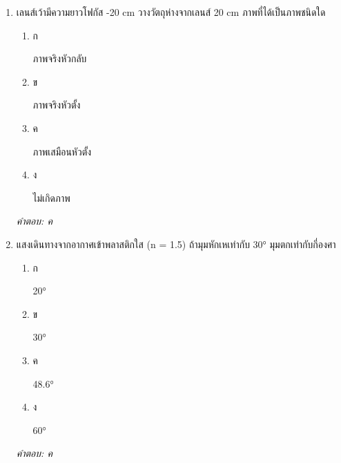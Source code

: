 \documentclass[12pt]{article}
\begin{document}
\begin{enumerate}[label=\arabic*., itemsep=0.5\baselineskip, topsep=0.5\baselineskip, leftmargin=*]
\item เลนส์เว้ามีความยาวโฟกัส -20 cm วางวัตถุห่างจากเลนส์ 20 cm ภาพที่ได้เป็นภาพชนิดใด
\begin{enumerate}[label=\alph*)., itemsep=0.3\baselineskip, topsep=0.3\baselineskip]
\item ก\ 
\begin{minipage}[t]{0.9\linewidth}
\raggedright ภาพจริงหัวกลับ
\end{minipage}
\item ข\ 
\begin{minipage}[t]{0.9\linewidth}
\raggedright ภาพจริงหัวตั้ง
\end{minipage}
\item ค\ 
\begin{minipage}[t]{0.9\linewidth}
\raggedright ภาพเสมือนหัวตั้ง
\end{minipage}
\item ง\ 
\begin{minipage}[t]{0.9\linewidth}
\raggedright ไม่เกิดภาพ
\end{minipage}
\end{enumerate}
\vspace{-0.3\baselineskip}
\begin{small}
\textit{คำตอบ: ค}
\end{small}

\item แสงเดินทางจากอากาศเข้าพลาสติกใส (n = 1.5) ถ้ามุมหักเหเท่ากับ 30° มุมตกเท่ากับกี่องศา
\begin{enumerate}[label=\alph*)., itemsep=0.3\baselineskip, topsep=0.3\baselineskip]
\item ก\ 
\begin{minipage}[t]{0.9\linewidth}
\raggedright 20°
\end{minipage}
\item ข\ 
\begin{minipage}[t]{0.9\linewidth}
\raggedright 30°
\end{minipage}
\item ค\ 
\begin{minipage}[t]{0.9\linewidth}
\raggedright 48.6°
\end{minipage}
\item ง\ 
\begin{minipage}[t]{0.9\linewidth}
\raggedright 60°
\end{minipage}
\end{enumerate}
\vspace{-0.3\baselineskip}
\begin{small}
\textit{คำตอบ: ค}
\end{small}


\end{enumerate}
\end{document}
